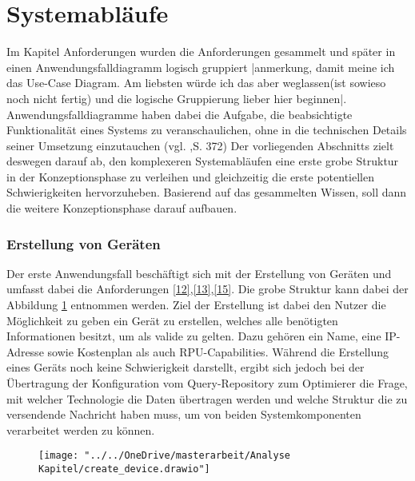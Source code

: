 


\section{Systemabläufe}
Im Kapitel Anforderungen wurden die Anforderungen gesammelt und später in einen Anwendungsfalldiagramm logisch gruppiert |anmerkung, damit meine ich das Use-Case Diagram. Am liebsten würde ich das aber weglassen(ist sowieso noch nicht fertig) und die logische Gruppierung lieber hier beginnen|. Anwendungsfalldiagramme haben dabei die Aufgabe, die beabsichtigte Funktionalität eines Systems zu veranschaulichen, ohne in die technischen Details seiner Umsetzung einzutauchen (vgl. \cite{Siau2002-ww},S. 372)
Der vorliegenden Abschnitts zielt deswegen darauf ab, den komplexeren Systemabläufen eine erste grobe Struktur in der Konzeptionsphase zu verleihen und gleichzeitig die erste potentiellen Schwierigkeiten hervorzuheben. Basierend auf das gesammelten Wissen, soll dann die weitere Konzeptionsphase darauf aufbauen.



\subsubsection{Erstellung von Geräten}
\label{device_creation}
Der erste Anwendungsfall beschäftigt sich mit der Erstellung von Geräten und umfasst dabei die Anforderungen \ref{12},\ref{13},\ref{15}. Die grobe Struktur kann dabei der Abbildung \ref{fig:createdevice} entnommen werden.
Ziel der Erstellung ist dabei den Nutzer die Möglichkeit zu geben ein Gerät zu erstellen, welches alle benötigten Informationen besitzt, um als valide zu gelten. Dazu gehören ein Name, eine IP-Adresse sowie Kostenplan als auch RPU-Capabilities. Während die Erstellung eines Geräts noch keine Schwierigkeit darstellt, ergibt sich jedoch bei der Übertragung der Konfiguration vom Query-Repository zum Optimierer die Frage, mit welcher Technologie die Daten übertragen werden und welche Struktur die zu versendende Nachricht haben muss, um von beiden Systemkomponenten verarbeitet werden zu können.

\begin{figure}[h!]
	\centering
	\texttt{[image: "../../OneDrive/masterarbeit/Analyse Kapitel/create\_device.drawio"]}
	\caption{}
	\label{fig:createdevice}
\end{figure}


